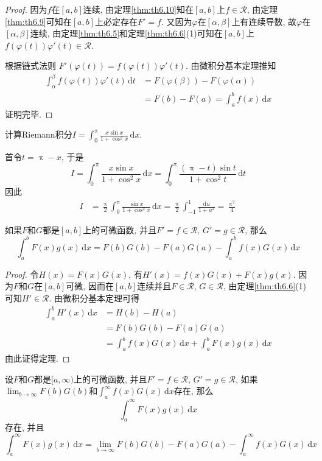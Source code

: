 \documentclass[cn,12pt,math=mtpro2,citestyle=gb7714-2015,bibstyle=gb7714-2015,twocol]{elegantbook}
\newcommand{\dx}{\,\text{d}x}
\newcommand{\dt}{\,\text{d}t}
\begin{document}
\begin{proof}
  因为$f$在$[a,b]$连续, 由定理\ref{thm:th6.10}知在$[a,b]$上$f\in \mathscr{R}$, 由定理\ref{thm:th6.9}可知在$[a,b]$上必定存在$F'=f$. 又因为$\varphi$在$[\alpha,\beta]$上有连续导数, 故$\varphi$在$[\alpha,\beta]$连续, 由定理\ref{thm:th6.5}和定理\ref{thm:th6.6}(1)可知在$[a,b]$上$f(\varphi(t))\varphi'(t)\in\mathscr{R}$.

  根据链式法则
  $F'(\varphi(t))=f(\varphi(t))\varphi'(t)$. 由微积分基本定理推知
  \begin{align*}
  \int_{\alpha}^{\beta}f(\varphi(t))\varphi'(t)\dt &=F(\varphi(\beta))-F(\varphi(\alpha)) \\
  &=F(b)-F(a)=\int_{a}^{b}f(x)\dx
  \end{align*}
  证明完毕.

\end{proof}
\begin{example}
计算Riemann积分$I=\int_{0}^{\uppi}\frac{x\sin x}{1+\cos^2 x}\dx$.
\end{example}

首令$t=\uppi-x$, 于是
$$I=\int_{0}^{\uppi}\frac{x\sin x}{1+\cos^2 x}\dx=\int_{0}^{\uppi}\frac{(\uppi-t)\sin t}{1+\cos^2t}\,\text{d}t$$
因此
\begin{align*}
I&=\frac{\uppi}{2}\int_{0}^{\uppi}\frac{\sin x}{1+\cos^2 x}\dx=\frac{\uppi}{2}\int_{-1}^{1}\frac{\text{d}u}{1+u^2}=\frac{\uppi^2}{4}
\end{align*}

\begin{theorem}[分部积分法]
  如果$F$和$G$都是$[a,b]$上的可微函数, 并且$F'=f\in\mathscr{R}$, $G'=g\in\mathscr{R}$, 那么
  $$\int_{a}^{b}F(x)g(x)\dx=F(b)G(b)-F(a)G(a)-\int_{a}^{b}f(x)G(x)\dx$$
\end{theorem}
\begin{proof}
  令$H(x)=F(x)G(x)$, 有$H'(x)=f(x)G(x)+F(x)g(x)$. 因为$F$和$G$在$[a,b]$可微, 因而在$[a,b]$连续并且$F\in \mathscr{R}$, $G\in\mathscr{R}$, 由定理\ref{thm:th6.6}(1)可知$H'\in\mathscr{R}$. 由微积分基本定理可得
  \begin{align*}
  \int_{a}^{b}H'(x)\dx&=H(b)-H(a) \\
  &=F(b)G(b)-F(a)G(a) \\
 & =\int_{a}^{b}f(x)G(x)\dx+\int_{a}^{b}F(x)g(x)\dx
  \end{align*}
  由此证得定理.

\end{proof}
\begin{corollary}
  设$F$和$G$都是$[a,\infty)$上的可微函数, 并且$F'=f\in\mathscr{R}$, $G'=g\in\mathscr{R}$, 如果$\displaystyle\lim_{b\to\infty}F(b)G(b)$和$\displaystyle\int_{a}^{\infty}f(x)G(x)\dx$存在, 那么
  $$\displaystyle\int_{a}^{\infty}F(x)g(x)\dx$$
  存在, 并且
  $$\int_{a}^{\infty}F(x)g(x)\dx=\lim_{b\to\infty}F(b)G(b)-F(a)G(a)-\int_{a}^{\infty}f(x)G(x)\dx$$
\end{corollary}
\end{document}
